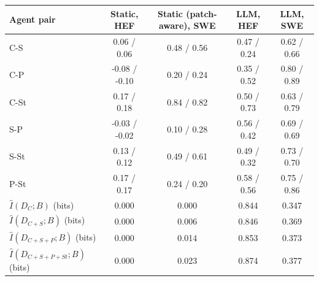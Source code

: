\begin{tabular}{@{}l cccc@{}}
\toprule
Agent pair & Static, HEF & Static (patch-aware), SWE & LLM, HEF & LLM, SWE \\
\midrule
C-S & 0.06 / 0.06 & 0.48 / 0.56 & 0.47 / 0.24 & 0.62 / 0.66 \\
C-P & -0.08 / -0.10 & 0.20 / 0.24 & 0.35 / 0.52 & 0.80 / 0.89 \\
C-St & 0.17 / 0.18 & 0.84 / 0.82 & 0.50 / 0.73 & 0.63 / 0.79 \\
S-P & -0.03 / -0.02 & 0.10 / 0.28 & 0.56 / 0.42 & 0.69 / 0.69 \\
S-St & 0.13 / 0.12 & 0.49 / 0.61 & 0.49 / 0.32 & 0.73 / 0.70 \\
P-St & 0.17 / 0.17 & 0.24 / 0.20 & 0.58 / 0.56 & 0.75 / 0.86 \\
\midrule
$\hat I(D_{C};B)$ (bits) & 0.000 & 0.000 & 0.844 & 0.347 \\
$\hat I(D_{C+S};B)$ (bits) & 0.000 & 0.006 & 0.846 & 0.369 \\
$\hat I(D_{C+S+P};B)$ (bits) & 0.000 & 0.014 & 0.853 & 0.373 \\
$\hat I(D_{C+S+P+St};B)$ (bits) & 0.000 & 0.023 & 0.874 & 0.377 \\
\bottomrule
\end{tabular}
